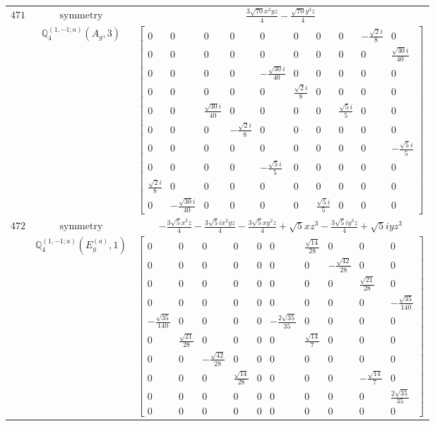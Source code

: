 \documentclass[fleqn,8pt,landscape]{jsarticle}
\begin{document}
\begin{longtable}{ccc}
$ 471 $ & $ \text{symmetry} $ & $ \frac{3 \sqrt{70} x^{2} y z}{4} - \frac{\sqrt{70} y^{3} z}{4} $ \\
$  $ & $ \mathbb{Q}_{4}^{(1,-1;a)}(A_{g},3) $ & $ \begin{bmatrix} 0 & 0 & 0 & 0 & 0 & 0 & 0 & 0 & - \frac{\sqrt{2} i}{8} & 0 \\ 0 & 0 & 0 & 0 & 0 & 0 & 0 & 0 & 0 & \frac{\sqrt{30} i}{40} \\ 0 & 0 & 0 & 0 & - \frac{\sqrt{30} i}{40} & 0 & 0 & 0 & 0 & 0 \\ 0 & 0 & 0 & 0 & 0 & \frac{\sqrt{2} i}{8} & 0 & 0 & 0 & 0 \\ 0 & 0 & \frac{\sqrt{30} i}{40} & 0 & 0 & 0 & 0 & \frac{\sqrt{5} i}{5} & 0 & 0 \\ 0 & 0 & 0 & - \frac{\sqrt{2} i}{8} & 0 & 0 & 0 & 0 & 0 & 0 \\ 0 & 0 & 0 & 0 & 0 & 0 & 0 & 0 & 0 & - \frac{\sqrt{5} i}{5} \\ 0 & 0 & 0 & 0 & - \frac{\sqrt{5} i}{5} & 0 & 0 & 0 & 0 & 0 \\ \frac{\sqrt{2} i}{8} & 0 & 0 & 0 & 0 & 0 & 0 & 0 & 0 & 0 \\ 0 & - \frac{\sqrt{30} i}{40} & 0 & 0 & 0 & 0 & \frac{\sqrt{5} i}{5} & 0 & 0 & 0 \end{bmatrix} $ \\ \hline
$ 472 $ & $ \text{symmetry} $ & $ - \frac{3 \sqrt{5} x^{3} z}{4} - \frac{3 \sqrt{5} i x^{2} y z}{4} - \frac{3 \sqrt{5} x y^{2} z}{4} + \sqrt{5} x z^{3} - \frac{3 \sqrt{5} i y^{3} z}{4} + \sqrt{5} i y z^{3} $ \\
$  $ & $ \mathbb{Q}_{4}^{(1,-1;a)}(E_{g}^{(a)},1) $ & $ \begin{bmatrix} 0 & 0 & 0 & 0 & 0 & 0 & \frac{\sqrt{14}}{28} & 0 & 0 & 0 \\ 0 & 0 & 0 & 0 & 0 & 0 & 0 & - \frac{\sqrt{42}}{28} & 0 & 0 \\ 0 & 0 & 0 & 0 & 0 & 0 & 0 & 0 & \frac{\sqrt{21}}{28} & 0 \\ 0 & 0 & 0 & 0 & 0 & 0 & 0 & 0 & 0 & - \frac{\sqrt{35}}{140} \\ - \frac{\sqrt{35}}{140} & 0 & 0 & 0 & 0 & - \frac{2 \sqrt{35}}{35} & 0 & 0 & 0 & 0 \\ 0 & \frac{\sqrt{21}}{28} & 0 & 0 & 0 & 0 & \frac{\sqrt{14}}{7} & 0 & 0 & 0 \\ 0 & 0 & - \frac{\sqrt{42}}{28} & 0 & 0 & 0 & 0 & 0 & 0 & 0 \\ 0 & 0 & 0 & \frac{\sqrt{14}}{28} & 0 & 0 & 0 & 0 & - \frac{\sqrt{14}}{7} & 0 \\ 0 & 0 & 0 & 0 & 0 & 0 & 0 & 0 & 0 & \frac{2 \sqrt{35}}{35} \\ 0 & 0 & 0 & 0 & 0 & 0 & 0 & 0 & 0 & 0 \end{bmatrix} $ \\ \hline

\end{longtable}
\end{document}
